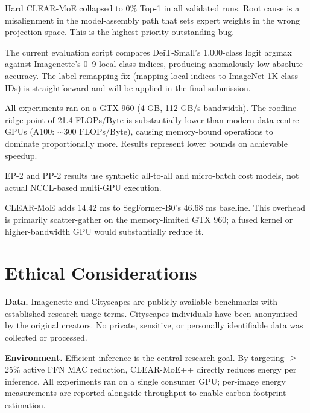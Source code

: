 \documentclass[12pt,a4paper]{article}
\begin{document}
\begin{description}[leftmargin=1.5em]
\item[Hard routing bug.] Hard CLEAR-MoE collapsed to 0\% Top-1 in all validated runs. Root cause is a misalignment in the model-assembly path that sets expert weights in the wrong projection space. This is the highest-priority outstanding bug.

\item[Label-space evaluation error.] The current evaluation script compares DeiT-Small's 1,000-class logit argmax against Imagenette's 0--9 local class indices, producing anomalously low absolute accuracy. The label-remapping fix (mapping local indices to ImageNet-1K class IDs) is straightforward and will be applied in the final submission.

\item[Hardware constraints.] All experiments ran on a GTX 960 (4 GB, 112 GB/s bandwidth). The roofline ridge point of 21.4 FLOPs/Byte is substantially lower than modern data-centre GPUs (A100: $\sim$300 FLOPs/Byte), causing memory-bound operations to dominate proportionally more. Results represent lower bounds on achievable speedup.

\item[Simulated parallelism.] EP-2 and PP-2 results use synthetic all-to-all and micro-batch cost models, not actual NCCL-based multi-GPU execution.

\item[Segmentation latency overhead.] CLEAR-MoE adds 14.42 ms to SegFormer-B0's 46.68 ms baseline. This overhead is primarily scatter-gather on the memory-limited GTX 960; a fused kernel or higher-bandwidth GPU would substantially reduce it.
\end{description}

\section{Ethical Considerations}
\label{sec:ethics}

\textbf{Data.} Imagenette and Cityscapes are publicly available benchmarks with established research usage terms. Cityscapes individuals have been anonymised by the original creators. No private, sensitive, or personally identifiable data was collected or processed.

\textbf{Environment.} Efficient inference is the central research goal. By targeting $\geq$25\% active FFN MAC reduction, CLEAR-MoE++ directly reduces energy per inference. All experiments ran on a single consumer GPU; per-image energy measurements are reported alongside throughput to enable carbon-footprint estimation.
\end{document}
